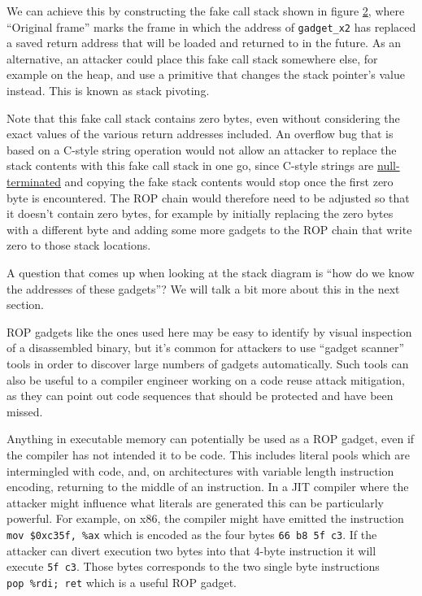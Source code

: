\documentclass[
  a4paper,
]{report}
\begin{document}
We can achieve this by constructing the fake call stack shown in figure
\hyperref[fig:rop-call-stack]{2}, where ``Original frame'' marks the
frame in which the address of \texttt{gadget\_x2} has replaced a saved
return address that will be loaded and returned to in the future. As an
alternative, an attacker could place this fake call stack somewhere
else, for example on the heap, and use a primitive that changes the
stack pointer's value instead. This is known as
\label{__index_entry_18}{stack
pivoting}.

Note that this fake call stack contains zero bytes, even without
considering the exact values of the various return addresses included.
An overflow bug that is based on a C-style string operation would not
allow an attacker to replace the stack contents with this fake call
stack in one go, since C-style strings are
\href{https://en.wikipedia.org/wiki/Null-terminated_string}{null-terminated}
and copying the fake stack contents would stop once the first zero byte
is encountered. The ROP chain would therefore need to be adjusted so
that it doesn't contain zero bytes, for example by initially replacing
the zero bytes with a different byte and adding some more gadgets to the
ROP chain that write zero to those stack locations.

A question that comes up when looking at the stack diagram is ``how do
we know the addresses of these gadgets''? We will talk a bit more about
this in the next section.

ROP gadgets like the ones used here may be easy to identify by visual
inspection of a disassembled binary, but it's common for attackers to
use ``\label{__index_entry_19}{gadget
scanner}'' tools in order to discover large
numbers of gadgets automatically. Such tools can also be useful to a
compiler engineer working on a code reuse attack mitigation, as they can
point out code sequences that should be protected and have been missed.

Anything in executable memory can potentially be used as a ROP gadget,
even if the compiler has not intended it to be code. This includes
literal pools which are intermingled with code, and, on architectures
with variable length instruction encoding, returning to the middle of an
instruction. In a JIT compiler where the attacker might influence what
literals are generated this can be particularly powerful. For example,
on x86, the compiler might have emitted the instruction
\texttt{mov\ \$0xc35f,\ \%ax} which is encoded as the four bytes
\texttt{66\ b8\ 5f\ c3}. If the attacker can divert execution two bytes
into that 4-byte instruction it will execute \texttt{5f\ c3}. Those
bytes corresponds to the two single byte instructions
\texttt{pop\ \%rdi;\ ret} which is a useful ROP gadget.
\end{document}
